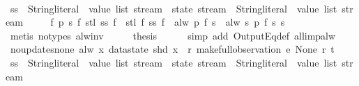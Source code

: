 \begin{isabellebody}
\ {\isacharminus}\isanewline
\ \ \isamarkupfalse%
\ ss\ {\isacharcolon}{\isacharcolon}\ {\isachardoublequoteopen}{\isacharparenleft}{\isacharparenleft}String{\isachardot}literal\ {\isasymtimes}\ value\ list{\isacharparenright}\ stream\ {\isasymRightarrow}\ state\ stream{\isacharparenright}\ {\isasymRightarrow}\ {\isacharparenleft}String{\isachardot}literal\ {\isasymtimes}\ value\ list{\isacharparenright}\ stream{\isachardoublequoteclose}\ \isanewline
\ \ \ \ {\isachardoublequoteopen}{\isasymforall}f\ p\ s{\isachardot}\ f\ {\isacharparenleft}stl\ {\isacharparenleft}ss\ f{\isacharparenright}{\isacharparenright}\ {\isasymnoteq}\ stl\ {\isacharparenleft}f\ {\isacharparenleft}ss\ f{\isacharparenright}{\isacharparenright}\ {\isasymor}\ alw\ p\ {\isacharparenleft}f\ s{\isacharparenright}\ {\isacharequal}\ alw\ {\isacharparenleft}{\isasymlambda}s{\isachardot}\ p\ {\isacharparenleft}f\ s{\isacharparenright}{\isacharparenright}\ s{\isachardoublequoteclose}\isanewline
\ \ \ \ \isamarkupfalse%
\ {\isacharparenleft}metis\ {\isacharparenleft}no{\isacharunderscore}types{\isacharparenright}\ alw{\isacharunderscore}inv{\isacharparenright}\isanewline
\ \ \isamarkupfalse%
\ \isamarkupfalse%
\ {\isacharquery}thesis\isanewline
\ \ \ \ \isamarkupfalse%
\ {\isacharparenleft}simp\ add{\isacharcolon}\ OutputEq{\isacharunderscore}def\ all{\isacharunderscore}imp{\isacharunderscore}alw{\isacharparenright}\isanewline
{}\isamarkupfalse%
%
\endisatagproof
{\isafoldproof}%
%
\isadelimproof
\isanewline
%
\endisadelimproof
\isanewline
{}\isamarkupfalse%
\ no{\isacharunderscore}updates{\isacharunderscore}none{\isacharcolon}\ {\isachardoublequoteopen}alw\ {\isacharparenleft}{\isasymlambda}x{\isachardot}\ datastate\ {\isacharparenleft}shd\ x{\isacharparenright}\ {\isacharequal}\ r{\isacharparenright}\ {\isacharparenleft}make{\isacharunderscore}full{\isacharunderscore}observation\ e\ None\ r\ t{\isacharparenright}{\isachardoublequoteclose}\isanewline
%
\isadelimproof
%
\endisadelimproof
%
\isatagproof
{}\isamarkupfalse%
\ {\isacharminus}\isanewline
\ \ \isamarkupfalse%
\ ss\ {\isacharcolon}{\isacharcolon}\ {\isachardoublequoteopen}{\isacharparenleft}{\isacharparenleft}String{\isachardot}literal\ {\isasymtimes}\ value\ list{\isacharparenright}\ stream\ {\isasymRightarrow}\ state\ stream{\isacharparenright}\ {\isasymRightarrow}\ {\isacharparenleft}String{\isachardot}literal\ {\isasymtimes}\ value\ list{\isacharparenright}\ stream{\isachardoublequoteclose}\ \isanewline

\end{isabellebody}
